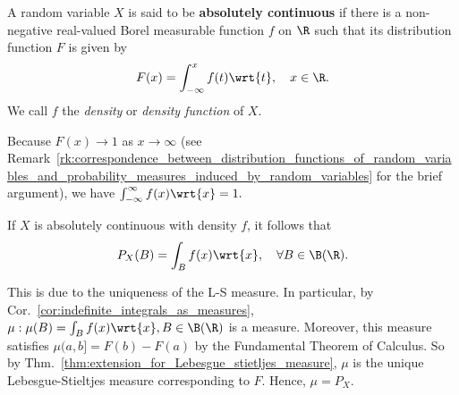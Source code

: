 \documentclass{article} %
\begin{document}
\begin{definition}{}
A random variable $X$ is said to be \textbf{absolutely continuous} if there is a non-negative real-valued Borel measurable function $f$ on $\R$ such that its distribution function $F$ is given by
\[ F(x) = \int_{-\infty}^x f(t) \wrt{t}, \quad x \in \R.\]
We call $f$ the \textit{density} or \textit{density function} of $X$. 
\label{def:absolutely_continuous_random_variable}
\end{definition}

\begin{remark}
Because $F(x) \to 1$ as $x \to \infty$ (see Remark~\ref{rk:correspondence_between_distribution_functions_of_random_variables_and_probability_measures_induced_by_random_variables} for the brief argument), we have 
$\int_{-\infty}^\infty f(x) \wrt{x} = 1.$ 	
\end{remark}

\begin{remark}
If $X$ is absolutely continuous with density $f$, it follows that
\begin{align}
P_X(B) = \int_B f(x) \wrt{x}, \quad \forall B \in \B(\R).
\label{eqn:probability_for_an_absolutely_continuous_rv_is_determined_by_integrating_the_density_function}	
\end{align}

This is due to the uniqueness of the L-S measure.  In particular, by Cor.~\ref{cor:indefinite_integrals_as_measures}, $\mu : \mu(B) = \int_B f(x) \wrt{x}, B \in \B(\R)$ is a measure.  Moreover, this measure satisfies $\mu(a,b] = F(b) - F(a)$ by the Fundamental Theorem of Calculus.  So by Thm.~\ref{thm:extension_for_Lebesgue_stietljes_measure},  $\mu$ is the unique Lebesgue-Stieltjes measure corresponding to $F$. Hence, $\mu=P_X$.
\label{rk:probability_for_an_absolutely_continuous_random_variable_is_determined_by_integrating_the_density_function}	
\end{remark}
\end{document}

